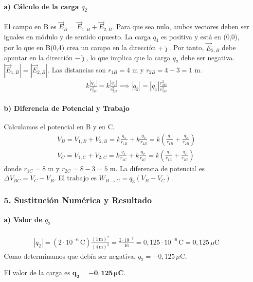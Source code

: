 \paragraph*{a) Cálculo de la carga $q_2$}
El campo en B es $\vec{E}_B = \vec{E}_{1,B} + \vec{E}_{2,B}$. Para que sea nulo, ambos vectores deben ser iguales en módulo y de sentido opuesto.
La carga $q_1$ es positiva y está en (0,0), por lo que en B(0,4) crea un campo en la dirección $+\hat{\jmath}$. Por tanto, $\vec{E}_{2,B}$ debe apuntar en la dirección $-\hat{\jmath}$, lo que implica que la carga $q_2$ debe ser negativa.
$|\vec{E}_{1,B}| = |\vec{E}_{2,B}|$. Las distancias son $r_{1B} = 4$ m y $r_{2B} = 4-3 = 1$ m.
\begin{gather}
    k \frac{|q_1|}{r_{1B}^2} = k \frac{|q_2|}{r_{2B}^2} \implies |q_2| = |q_1| \frac{r_{2B}^2}{r_{1B}^2}
\end{gather}
\paragraph*{b) Diferencia de Potencial y Trabajo}
Calculamos el potencial en B y en C.
\begin{gather}
    V_B = V_{1,B} + V_{2,B} = k\frac{q_1}{r_{1B}} + k\frac{q_2}{r_{2B}} = k\left(\frac{q_1}{r_{1B}} + \frac{q_2}{r_{2B}}\right) \\
    V_C = V_{1,C} + V_{2,C} = k\frac{q_1}{r_{1C}} + k\frac{q_2}{r_{2C}} = k\left(\frac{q_1}{r_{1C}} + \frac{q_2}{r_{2C}}\right)
\end{gather}
donde $r_{1C} = 8$ m y $r_{2C} = 8-3 = 5$ m.
La diferencia de potencial es $\Delta V_{BC} = V_C - V_B$. El trabajo es $W_{B \to C} = q_3(V_B - V_C)$.

\subsubsection*{5. Sustitución Numérica y Resultado}
\paragraph*{a) Valor de $q_2$}
\begin{gather}
    |q_2| = (2 \cdot 10^{-6} \, \text{C}) \frac{(1 \, \text{m})^2}{(4 \, \text{m})^2} = \frac{2 \cdot 10^{-6}}{16} = 0,125 \cdot 10^{-6} \, \text{C} = 0,125 \, \mu\text{C}
\end{gather}
Como determinamos que debía ser negativa, $q_2 = -0,125 \, \mu\text{C}$.
\begin{cajaresultado}
    El valor de la carga es $\boldsymbol{q_2 = -0,125 \, \mu\textbf{C}}$.
\end{cajaresultado}
